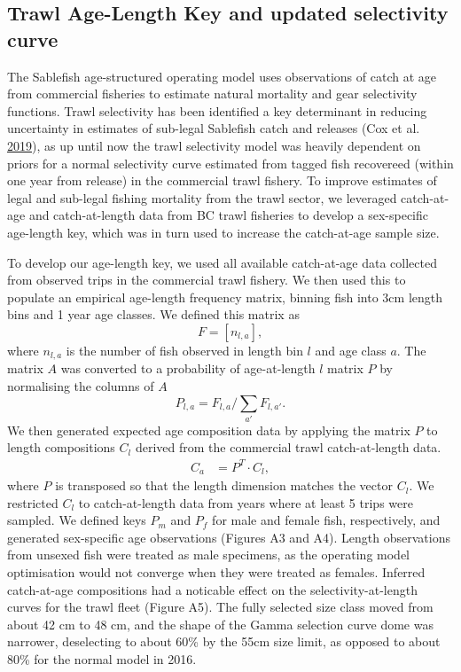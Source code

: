 \documentclass[11pt]{book}
\begin{document}
\hypertarget{trawl-age-length-key-and-updated-selectivity-curve}{%
\subsection{Trawl Age-Length Key and updated selectivity curve}\label{trawl-age-length-key-and-updated-selectivity-curve}}

The Sablefish age-structured operating model uses observations of catch at age from commercial fisheries to estimate natural mortality and gear selectivity functions. Trawl selectivity has been identified a key determinant in reducing uncertainty in estimates of sub-legal Sablefish catch and releases (Cox et al. \protect\hyperlink{ref-cox2019evaluating}{2019}), as up until now the trawl selectivity model was heavily dependent on priors for a normal selectivity curve estimated from tagged fish recovereed (within one year from release) in the commercial trawl fishery. To improve estimates of legal and sub-legal fishing mortality from the trawl sector, we leveraged catch-at-age and catch-at-length data from BC trawl fisheries to develop a sex-specific age-length key, which was in turn used to increase the catch-at-age sample size.

To develop our age-length key, we used all available catch-at-age data collected from observed trips in the commercial trawl fishery. We then used this to populate an empirical age-length frequency matrix, binning fish into 3cm length bins and 1 year age classes. We defined this matrix as \begin{equation}
F = \left[ n_{l,a} \right],
\end{equation} where \(n_{l,a}\) is the number of fish observed in length bin \(l\) and age class \(a\). The matrix \(A\) was converted to a probability of age-at-length \(l\) matrix \(P\) by normalising the columns of \(A\) \begin{equation}
P_{l,a} = F_{l,a} / \sum_{a'} F_{l,a'}. 
\end{equation}
We then generated expected age composition data by applying the matrix \(P\) to length compositions \(C_l\) derived from the commercial trawl catch-at-length data. \begin{align}
C_a &= P^T \cdot C_l,
\end{align} where \(P\) is transposed so that the length dimension matches the vector \(C_l\). We restricted \(C_l\) to catch-at-length data from years where at least 5 trips were sampled. We defined keys \(P_m\) and \(P_f\) for male and female fish, respectively, and generated sex-specific age observations (Figures A3 and A4). Length observations from unsexed fish were treated as male specimens, as the operating model optimisation would not converge when they were treated as females.
Inferred catch-at-age compositions had a noticable effect on the selectivity-at-length curves for the trawl fleet (Figure A5). The fully selected size class moved from about 42 cm to 48 cm, and the shape of the Gamma selection curve dome was narrower, deselecting to about 60\% by the 55cm size limit, as opposed to about 80\% for the normal model in 2016.
\end{document}
